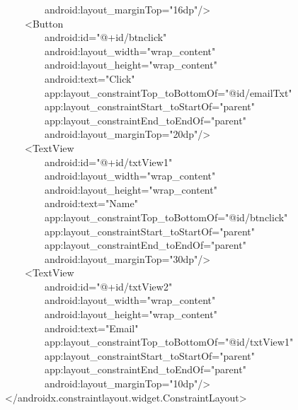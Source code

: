 {\ttfamily\small \ \ \ \ \ \ \ \ android:layout\_marginTop="16dp"/\textgreater{}} \\
{\ttfamily\small \ \ \ \ \textless{}Button} \\
{\ttfamily\small \ \ \ \ \ \ \ \ android:id="@+id/btnclick"} \\
{\ttfamily\small \ \ \ \ \ \ \ \ android:layout\_width="wrap\_content"} \\
{\ttfamily\small \ \ \ \ \ \ \ \ android:layout\_height="wrap\_content"} \\
{\ttfamily\small \ \ \ \ \ \ \ \ android:text="Click"} \\
{\ttfamily\small \ \ \ \ \ \ \ \ app:layout\_constraintTop\_toBottomOf="@id/emailTxt"} \\
{\ttfamily\small \ \ \ \ \ \ \ \ app:layout\_constraintStart\_toStartOf="parent"} \\
{\ttfamily\small \ \ \ \ \ \ \ \ app:layout\_constraintEnd\_toEndOf="parent"} \\
{\ttfamily\small \ \ \ \ \ \ \ \ android:layout\_marginTop="20dp"/\textgreater{}} \\
{\ttfamily\small \ \ \ \ \textless{}TextView} \\
{\ttfamily\small \ \ \ \ \ \ \ \ android:id="@+id/txtView1"} \\
{\ttfamily\small \ \ \ \ \ \ \ \ android:layout\_width="wrap\_content"} \\
{\ttfamily\small \ \ \ \ \ \ \ \ android:layout\_height="wrap\_content"} \\
{\ttfamily\small \ \ \ \ \ \ \ \ android:text="Name"} \\
{\ttfamily\small \ \ \ \ \ \ \ \ app:layout\_constraintTop\_toBottomOf="@id/btnclick"} \\
{\ttfamily\small \ \ \ \ \ \ \ \ app:layout\_constraintStart\_toStartOf="parent"} \\
{\ttfamily\small \ \ \ \ \ \ \ \ app:layout\_constraintEnd\_toEndOf="parent"} \\
{\ttfamily\small \ \ \ \ \ \ \ \ android:layout\_marginTop="30dp"/\textgreater{}} \\
{\ttfamily\small \ \ \ \ \textless{}TextView} \\
{\ttfamily\small \ \ \ \ \ \ \ \ android:id="@+id/txtView2"} \\
{\ttfamily\small \ \ \ \ \ \ \ \ android:layout\_width="wrap\_content"} \\
{\ttfamily\small \ \ \ \ \ \ \ \ android:layout\_height="wrap\_content"} \\
{\ttfamily\small \ \ \ \ \ \ \ \ android:text="Email"} \\
{\ttfamily\small \ \ \ \ \ \ \ \ app:layout\_constraintTop\_toBottomOf="@id/txtView1"} \\
{\ttfamily\small \ \ \ \ \ \ \ \ app:layout\_constraintStart\_toStartOf="parent"} \\
{\ttfamily\small \ \ \ \ \ \ \ \ app:layout\_constraintEnd\_toEndOf="parent"} \\
{\ttfamily\small \ \ \ \ \ \ \ \ android:layout\_marginTop="10dp"/\textgreater{}} \\
{\ttfamily\small \textless{}/androidx.constraintlayout.widget.ConstraintLayout\textgreater{}} \\

